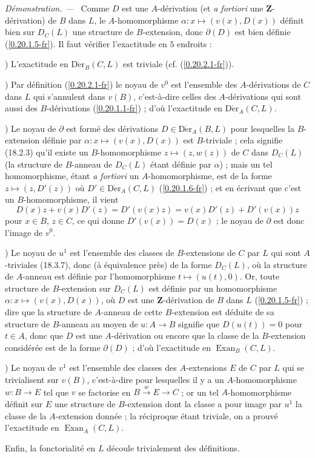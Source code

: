 \documentclass[10pt,oneside]{book}
\newcommand{\sref}[1]{(\ref{#1})}
\newenvironment{proof}{%
  \par\medskip\noindent\textit{Démonstration. ---\ }}{\par}
\begin{document}
\begin{proof}
Comme $D$ est une $A$-dérivation (et \emph{a fortiori} une
$\mathbf{Z}$-dérivation) de $B$ dans $L$, le $A$-homomorphisme
$\alpha:x\mapsto(v(x),D(x))$ définit bien sur $D_C(L)$ une structure de
$B$-extension, donc $\partial(D)$ est bien définie \sref{0.20.1.5-fr}. Il
faut vérifier l'exactitude en $5$ endroits :

\medskip
{})\enspace
L'exactitude en $\operatorname{D\acute{e}r}_B(C,L)$ est triviale (cf.
\sref{0.20.2.1-fr}).

\medskip
{})\enspace
Par définition \sref{0.20.2.1-fr} le noyau de $v^0$ est l'ensemble des
$A$-dérivations de $C$ dans $L$ qui s'annulent dans $v(B)$, c'est-à-dire
celles des $A$-dérivations qui sont aussi des $B$-dérivations
\sref{0.20.1.1-fr} ; d'où l'exactitude en $\operatorname{D\acute{e}r}_A(C,L)$.

\medskip
{})\enspace
Le noyau de $\partial$ est formé des dérivations
$D\in\operatorname{D\acute{e}r}_A(B,L)$ pour lesquelles la $B$-extension définie par
$\alpha:x\mapsto(v(x),D(x))$ est $B$-triviale ; cela signifie (18.2.3) qu'il
existe un $B$-homomorphisme $z\mapsto(z,w(z))$ de $C$ dans $D_C(L)$ (la
structure de $B$-anneau de $D_C(L)$ étant définie par $\alpha$) ; mais un tel
homomorphisme, étant \emph{a fortiori} un $A$-homomorphisme, est de la forme
$z\mapsto(z,D'(z))$ où $D'\in\operatorname{D\acute{e}r}_A(C,L)$
\sref{0.20.1.6-fr} ; et en écrivant que c'est un $B$-homomorphisme, il vient
\[
  D(x)z+v(x)D'(z)=D'(v(x)z)=v(x)D'(z)+D'(v(x))z
\]
pour $x\in B$, $z\in C$, ce qui donne $D'(v(x))=D(x)$ ; le noyau de
$\partial$ est donc l'image de $v^0$.

\medskip
{})\enspace
Le noyau de $u^1$ est l'ensemble des classes de $B$-extensions de $C$ par
$L$ qui sont $A$-triviales (18.3.7), donc (à équivalence près) de la forme
$D_C(L)$, où la structure de $A$-anneau est définie par l'homomorphisme
$t\mapsto(u(t),0)$. Or, toute structure de $B$-extension sur $D_C(L)$ est
définie par un homomorphisme $\alpha:x\mapsto(v(x),D(x))$, où $D$ est une
$\mathbf{Z}$-dérivation de $B$ dans $L$ \sref{0.20.1.5-fr} ; dire que la
structure de $A$-anneau de cette $B$-extension est déduite de sa structure de
$B$-anneau au moyen de $u:A\to B$ signifie que $D(u(t))=0$ pour $t\in A$,
donc que $D$ est une $A$-dérivation ou encore que la classe de la $B$-extension
considérée est de la forme $\partial(D)$ ; d'où l'exactitude en
$\operatorname{Exan}_B(C,L)$.

\medskip
{})\enspace
Le noyau de $v^1$ est l'ensemble des classes des $A$-extensions $E$ de $C$
par $L$ qui se trivialisent sur $v(B)$, c'est-à-dire pour lesquelles il y a un
$A$-homomorphisme $w:B\to E$ tel que $v$ se factorise en
$B\xrightarrow{w}E\to C$ ; or un tel $A$-homomorphisme définit sur $E$ une
structure de $B$-extension dont la classe a pour image par $u^1$ la classe de
la $A$-extension donnée ; la réciproque étant triviale, on a prouvé
l'exactitude en $\operatorname{Exan}_A(C,L)$.

Enfin, la fonctorialité en $L$ découle trivialement des définitions.
\end{proof}
\end{document}
